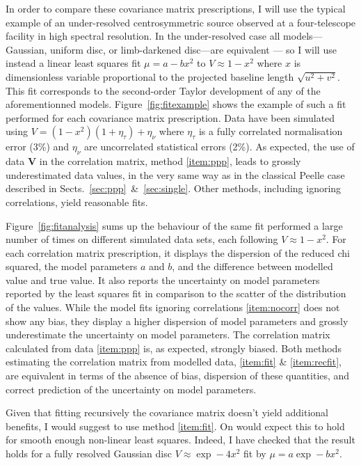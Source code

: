 \documentclass[a4paper,fleqn,usenatbib]{mnras}
\def\vec#1{\ensuremath{\boldsymbol{#1}}}
\def\norm{_\tau}
\def\meas{_\nu}
\def\data{\ensuremath{{\scriptstyle V}}}
\def\vdata{\ensuremath{\vec\data}}
\def\mod{\ensuremath{\mu}}
\def\error{\ensuremath{\eta}}
\def\relerror{\ensuremath{\error\norm}}
\def\abserror{\ensuremath{\error\meas}}
\begin{document}
In order to compare these covariance matrix prescriptions, I will use the typical example of an under-resolved centrosymmetric source observed at a four-telescope facility in high spectral resolution. In the under-resolved case all models---Gaussian, uniform disc, or limb-darkened disc---are equivalent \citep{LAC03}--- so I will use instead a linear least squares fit $\mod = a - bx^2$ to $\data \approx 1 - x^2$ where $x$ is dimensionless variable proportional to the projected baseline length $\sqrt{u^2+v^2}$. This fit corresponds to the second-order Taylor development of any of the aforementionned models.  Figure~\ref{fig:fitexample} shows the example of such a fit performed for each covariance matrix prescription.  Data have been simulated using $\data = (1-x^2)(1 + \relerror) + \abserror$ where $\relerror$ is a fully correlated normalisation error (3\%) and $\abserror$ are uncorrelated statistical errors (2\%). As expected, the use of data $\vdata$ in the correlation matrix, method \ref{item:ppp}, leads to grossly underestimated data values, in the very same way as in the classical Peelle case described in Sects.~\ref{sec:ppp}~\&~\ref{sec:single}.  Other methods, including ignoring correlations, yield reasonable fits.

Figure~\ref{fig:fitanalysis} sums up the behaviour of the same fit performed a large number of times on different simulated data sets, each following $\data \approx 1-x^2$.  For each correlation matrix prescription, it displays the dispersion of the reduced chi squared, the model parameters $a$ and $b$, and the difference between modelled value and true value. It also reports the uncertainty on model parameters reported by the least squares fit in comparison to the scatter of the distribution of the values. While the model fits ignoring correlations \ref{item:nocorr} does not show any bias, they display a higher dispersion of model parameters and grossly underestimate the uncertainty on model parameters.  The correlation matrix calculated from data \ref{item:ppp} is, as expected, strongly biased. Both methods estimating the correlation  matrix from modelled data, \ref{item:fit} \& \ref{item:recfit}, are equivalent in terms of the absence of bias, dispersion of these quantities, and correct prediction of the uncertainty on model parameters.

Given that fitting recursively the covariance matrix doesn't yield additional benefits, I would suggest to use method \ref{item:fit}. On would expect this to hold for smooth enough non-linear least squares. Indeed, I have checked that the result holds for a fully resolved Gaussian disc $\data \approx \exp -4x^2$ fit by $\mod = a\exp -bx^2$.
\end{document}
